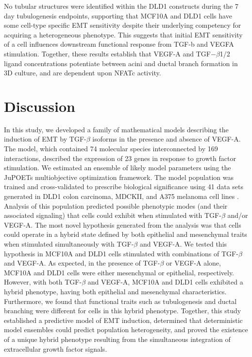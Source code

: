 \documentclass[11pt,letterpaper]{article}
\begin{document}
No tubular structures were identified within the DLD1 constructs during the 7 day tubulogenesis endpoints, supporting that MCF10A and DLD1 cells have some cell-type specific EMT sensitivity despite their underlying competency for acquiring a heterogeneous phenotype. This suggests that initial EMT sensitivity of a cell influences downstream functional response from TGF-b and VEGFA stimulation. Together, these results establish that VEGF-A and TGF$-\beta$1/2 ligand concentrations potentiate between acini and ductal branch formation in 3D culture, and are dependent upon NFATc activity.



\section*{Discussion}
In this study, we developed a family of mathematical models describing the induction of EMT by TGF-$\beta$ isoforms in the presence and absence of VEGF-A.
The model, which contained 74 molecular species interconnected by 169 interactions,
described the expression of 23 genes in response to growth factor stimulation.
We estimated an ensemble of likely model parameters using the JuPOETs multiobjective optimization framework.
The model population was trained and cross-validated to prescribe biological significance using 41 data sets generated in DLD1 colon carcinoma, MDCKII, and A375 melanoma cell lines \cite{Medici:2008fk}.
Analysis of this population predicted possible phenotypic modes (and their associated signaling) that cells could exhibit when stimulated with TGF-$\beta$ and/or VEGF-A.
The most novel hypothesis generated from the analysis was that cells could operate in a hybrid state defined by both epithelial and mesenchymal traits when stimulated simultaneously with TGF-$\beta$ and VEGF-A.
We tested this hypothesis in MCF10A and DLD1 cells stimulated with combinations of TGF-$\beta$ and VEGF-A.
As expected, in the presence of TGF-$\beta$ or VEGF-A alone, MCF10A and DLD1 cells were either mesenchymal or epithelial, respectively.
However, with both TGF-$\beta$ and VEGF-A, MCF10A and DLD1 cells exhibited a hybrid phenotype, having both epithelial and mesenchymal characteristics.
Furthermore, we found that functional traits such as tubulogenesis and ductal branching were different for cells in this hybrid phenotype.
Together, this study established a predictive model of EMT induction, determined that deterministic model ensembles could predict population heterogeneity, and proved the existence of a unique hybrid phenotype resulting from the simultaneous integration of extracellular growth factor signals.
\end{document}
